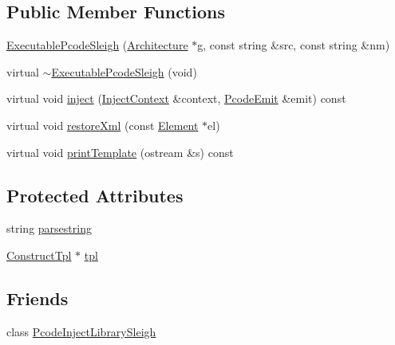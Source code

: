 \subsection*{Public Member Functions}
\begin{DoxyCompactItemize}
\item 
\mbox{\hyperlink{class_executable_pcode_sleigh_a6ff724654bd9402977ba1999cfe4f8a3}{Executable\+Pcode\+Sleigh}} (\mbox{\hyperlink{class_architecture}{Architecture}} $\ast$g, const string \&src, const string \&nm)
\item 
virtual \mbox{\hyperlink{class_executable_pcode_sleigh_a2c9bd0277ad3c6d111cd762e442f9074}{$\sim$\+Executable\+Pcode\+Sleigh}} (void)
\item 
virtual void \mbox{\hyperlink{class_executable_pcode_sleigh_a371bf279788a99380a3fb273e99a0266}{inject}} (\mbox{\hyperlink{class_inject_context}{Inject\+Context}} \&context, \mbox{\hyperlink{class_pcode_emit}{Pcode\+Emit}} \&emit) const
\item 
virtual void \mbox{\hyperlink{class_executable_pcode_sleigh_a066df419c0549f9279712783e6ceaa72}{restore\+Xml}} (const \mbox{\hyperlink{class_element}{Element}} $\ast$el)
\item 
virtual void \mbox{\hyperlink{class_executable_pcode_sleigh_aff5af659202741955010a5302bd08dcd}{print\+Template}} (ostream \&s) const
\end{DoxyCompactItemize}
\subsection*{Protected Attributes}
\begin{DoxyCompactItemize}
\item 
string \mbox{\hyperlink{class_executable_pcode_sleigh_a2983c78a762fc7083776690928dce88c}{parsestring}}
\item 
\mbox{\hyperlink{class_construct_tpl}{Construct\+Tpl}} $\ast$ \mbox{\hyperlink{class_executable_pcode_sleigh_afadc3799f3bccc6f2ab372248caee10f}{tpl}}
\end{DoxyCompactItemize}
\subsection*{Friends}
\begin{DoxyCompactItemize}
\item 
class \mbox{\hyperlink{class_executable_pcode_sleigh_a66b43a88911f518d0a761ebd9375c30f}{Pcode\+Inject\+Library\+Sleigh}}
\end{DoxyCompactItemize}


